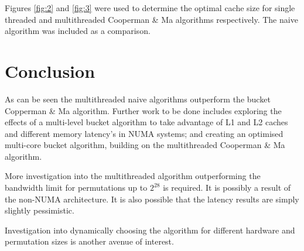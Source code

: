 \documentclass{article}
\begin{document}
\clearpage

Figures \ref{fig:2} and \ref{fig:3} were used to determine the optimal cache size for single threaded and multithreaded Cooperman \& Ma algorithms respectively.
The naive algorithm was included as a comparison.






\section{Conclusion}


As can be seen the multithreaded naive algorithms outperform the bucket Copperman \& Ma algorithm.
Further work to be done includes exploring the effects of a multi-level bucket algorithm to take advantage of L1 and L2 caches and different memory latency's in NUMA systems; and creating an optimised multi-core bucket algorithm, building on the multithreaded Cooperman \& Ma algorithm.

More investigation into the multithreaded algorithm outperforming the bandwidth limit for permutations up to $2^28$ is required. It is possibly a result of the non-NUMA architecture.
It is also possible that the latency results are simply slightly pessimistic.

Investigation into dynamically choosing the algorithm for different hardware and permutation sizes is another avenue of interest.



\end{document}
